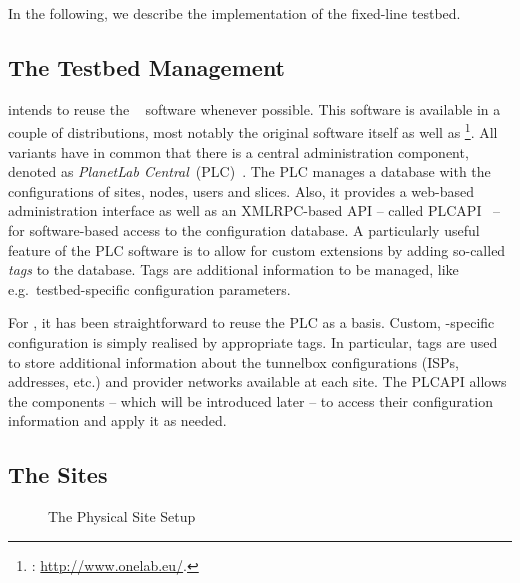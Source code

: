 In the following, we describe the implementation of the fixed-line  testbed.


\subsection{The Testbed Management}
\label{sub:The-Testbed-Management}

 intends to reuse the ~\cite{PBF+05} software whenever possible. This software is available in a couple of distributions, most notably the original  software itself as well as \footnote{: \url{http://www.onelab.eu/}.}. All variants have in common that there is a central administration component, denoted as \emph{PlanetLab Central}~(PLC)~\cite{Hua06}. The PLC manages a database with the configurations of sites, nodes, users and slices. Also, it provides a web-based administration interface as well as an XMLRPC-based API -- called PLCAPI~\cite{PLCAPI} -- for software-based access to the configuration database. A particularly useful feature of the PLC software is to allow for custom extensions by adding so-called \emph{tags} to the database. Tags are additional information to be managed, like e.g.\ testbed-specific configuration parameters.

For , it has been straightforward to reuse the PLC as a basis. Custom, -specific configuration is simply realised by appropriate tags. In particular, tags are used to store additional information about the tunnelbox configurations (ISPs, addresses, etc.) and provider networks available at each site. The PLCAPI allows the  components -- which will be introduced later -- to access their configuration information and apply it as needed.


\subsection{The Sites}
\label{sub:The-Sites}

\begin{figure}
\begin{center}
\end{center}
\caption{The Physical Site Setup}
\label{cap:The-Site-Setup}
\end{figure}

